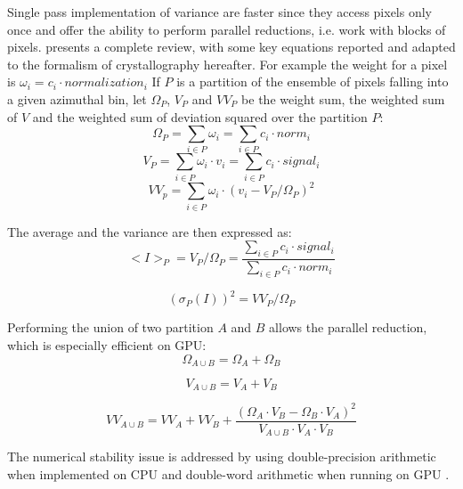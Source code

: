 \documentclass[preprint]{iucr}              %
\begin{document}
 
Single pass implementation of variance are faster since they access pixels only once and offer the ability to perform parallel reductions, i.e. work with blocks of pixels.
 presents a complete review, with some key equations reported and adapted to the formalism of crystallography hereafter.
For example the weight for a pixel is $\omega_i = c_i \cdot normalization_i$
If $P$ is a partition of the ensemble of pixels falling into a given azimuthal bin, let $\Omega_{P}$, $V_{P}$ and $VV_{P}$  
be the weight sum, the weighted sum of $V$ and the weighted sum of deviation squared over the partition $P$: 
\begin{equation}
\Omega_{P} = \sum\limits_{i \in P} \omega_i = \sum\limits_{i \in P} c_i \cdot norm_i 
\end{equation}
\begin{equation}
V_{P} = \sum\limits_{i \in P} \omega_i \cdot v_i =  \sum\limits_{i \in P} c_i \cdot signal_i
\end{equation}
\begin{equation}
VV_{p} = \sum\limits_{i \in P} \omega_i \cdot (v_i - V_{P}/\Omega_{P})^2 
\end{equation}

The average and the variance are then expressed as:
\begin{equation}
<I>_P = V_{P}/\Omega_{P} =  \frac{\sum\limits_{i \in P} c_i \cdot signal_i}
                        {\sum\limits_{i \in P} c_i \cdot norm_i} 
\end{equation}

\begin{equation}
(\sigma_P(I))^2 = VV_{P}/\Omega_{P} 
\end{equation}

Performing the union of two partition $A$ and $B$ allows the parallel reduction, which is especially efficient on GPU:
\begin{equation}
\Omega_{A \cup B} =  \Omega_{A} + \Omega_{B} 
\end{equation}

\begin{equation}
V_{A \cup B} =  V_{A} + V_{B} 
\end{equation}
  
\begin{equation}
VV_{A \cup B} =  VV_{A} + VV_{B} +  \frac{(\Omega_{A} \cdot V_{B} - \Omega_{B}\cdot V_{A})^2}{V_{A \cup B} \cdot  V_{A} \cdot V_{B}}
\end{equation}
  
The numerical stability issue is addressed by using double-precision arithmetic when implemented on CPU and double-word arithmetic when running on GPU \cite{double_word}.
\end{document}
